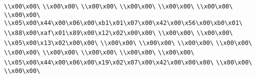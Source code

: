 \verb|\\x00\x00\|\newline
\verb|\\x00\x00\|\newline
\verb|\\x00\x00\|\newline
\verb|\\x00\x00\|\newline
\verb|\\x00\x00\|\newline
\verb|\\x00\x00\|\newline
\verb|\\x00\x00\|\newline
\verb|\\x05\x00\x44\x00\x06\x00\xb1\x01\x07\x00\x42\x00\x56\x00\xb0\x01\|\newline
\verb|\\x88\x00\xaf\x01\x89\x00\x12\x02\x00\x00\|\newline
\verb|\\x00\x00\|\newline
\verb|\\x00\x00\|\newline
\verb|\\x05\x00\x13\x02\x00\x00\|\newline
\verb|\\x00\x00\|\newline
\verb|\\x00\x00\|\newline
\verb|\\x00\x00\|\newline
\verb|\\x00\x00\|\newline
\verb|\\x00\x00\|\newline
\verb|\\x00\x00\|\newline
\verb|\\x00\x00\|\newline
\verb|\\x00\x00\|\newline
\verb|\\x00\x00\|\newline
\verb|\\x05\x00\x44\x00\x06\x00\x19\x02\x07\x00\x42\x00\x00\x00\|\newline
\verb|\\x00\x00\|\newline
\verb|\\x00\x00\|\newline
